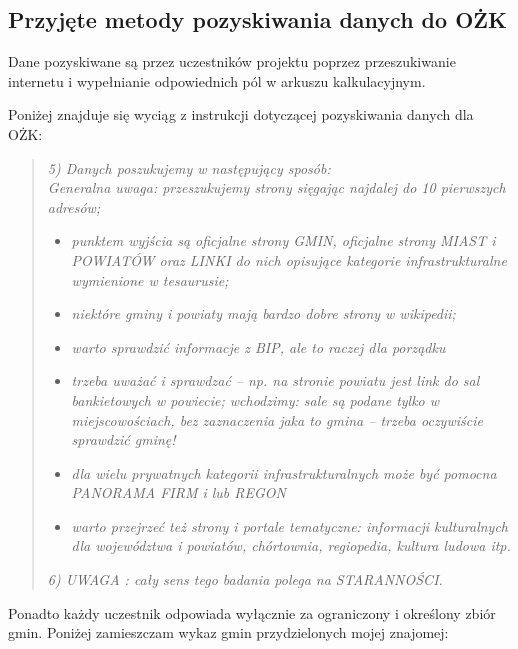 \documentclass[a4 122pt]{article}
\begin{document}
		\subsection{Przyjęte metody pozyskiwania danych do OŻK}

			Dane pozyskiwane są przez uczestników projektu poprzez przeszukiwanie internetu i wypełnianie odpowiednich pól w arkuszu kalkulacyjnym.
			
			Poniżej znajduje się wyciąg z instrukcji dotyczącej pozyskiwania danych dla OŻK:
			
			
			\begin{quote}

				\textit{5) Danych poszukujemy w następujący sposób:\\
				Generalna uwaga: przeszukujemy strony sięgając najdalej do 10 pierwszych adresów;}
				
				
				\begin{itemize}
				
					\item \textit{punktem wyjścia są oficjalne strony GMIN, oficjalne strony MIAST i POWIATÓW oraz LINKI do nich opisujące kategorie infrastrukturalne wymienione w tesaurusie;}
					\item \textit{niektóre gminy i powiaty mają bardzo dobre strony w wikipedii;}
					\item \textit{warto sprawdzić informacje z BIP, ale to raczej dla porządku}
					\item \textit{trzeba uważać i sprawdzać – np. na stronie powiatu jest link do sal bankietowych w powiecie; wchodzimy: sale są podane tylko w miejscowościach, bez zaznaczenia jaka to gmina – trzeba oczywiście sprawdzić gminę!}
					\item \textit{dla wielu prywatnych kategorii infrastrukturalnych może być pomocna PANORAMA FIRM i lub REGON}
					\item \textit{warto przejrzeć też strony i portale tematyczne: informacji kulturalnych dla województwa i powiatów, chórtownia, regiopedia, kultura ludowa itp.}
				\end{itemize}
				
				\textit{6) UWAGA : cały sens tego badania polega na STARANNOŚCI.}
			\end{quote}
	
			Ponadto każdy uczestnik odpowiada wyłącznie za ograniczony i określony zbiór gmin.
			Poniżej zamieszczam wykaz gmin przydzielonych mojej znajomej:
			
\end{document}

